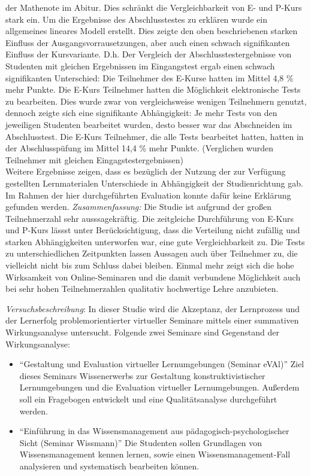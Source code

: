 \documentclass[12pt, bibliography=totoc]{scrartcl}
\begin{document}
der Mathenote im Abitur. Dies schränkt die Vergleichbarkeit von E- und
P-Kurs stark ein. Um die Ergebnisse des Abschlusstestes zu erklären
wurde ein allgemeines lineares Modell erstellt. Dies zeigte den oben
beschriebenen starken Einfluss der Ausgangsvorrausetzungen, aber auch
einen schwach signifikanten Einfluss der Kursvariante. D.h. Der
Vergleich der Abschlusstestergebnisse von Studenten mit gleichen
Ergebnissen im Eingangstest ergab einen schwach signifikanten
Unterschied: Die Teilnehmer des E-Kurse hatten im Mittel 4,8 \% mehr
Punkte. Die E-Kurs Teilnehmer hatten die Möglichkeit elektronische Tests
zu bearbeiten. Dies wurde zwar von vergleichsweise wenigen Teilnehmern
genutzt, dennoch zeigte sich eine signifikante Abhängigkeit: Je mehr
Tests von den jeweiligen Studenten bearbeitet wurden, desto besser war
das Abschneiden im Abschlusstest. Die E-Kurs Teilnehmer, die alle Tests
bearbeitet hatten, hatten in der Abschlusspüfung im Mittel 14,4 \% mehr
Punkte. (Verglichen wurden Teilnehmer mit gleichen
Eingagstestergebnissen)\\Weitere Ergebnisse zeigen, dass es bezüglich
der Nutzung der zur Verfügung gestellten Lernmaterialen Unterschiede in
Abhängigkeit der Studienrichtung gab. Im Rahmen der hier durchgeführten
Evaluation konnte dafür keine Erklärung gefunden werden.
\emph{Zusammenfassung:} Die Studie ist aufgrund der großen
Teilnehmerzahl sehr ausssagekräftig. Die zeitgleiche Durchführung von
E-Kurs und P-Kurs lässst unter Berücksichtigung, dass die Verteilung
nicht zufällig und starken Abhängigkeiten unterworfen war, eine gute
Vergleichbarkeit zu. Die Tests zu unterschiedlichen Zeitpunkten lassen
Aussagen auch über Teilnehmer zu, die vielleicht nicht bis zum Schluss
dabei bleiben. Einmal mehr zeigt sich die hohe Wirksamkeit von
Online-Seminaren und die damit verbundene Möglichkeit auch bei sehr
hohen Teilnehmerzahlen qualitativ hochwertige Lehre anzubieten.

\textbf{}

\emph{Versuchsbeschreibung}: In dieser Studie wird die Akzeptanz, der
Lernprozess und der Lernerfolg problemorientierter virtueller Seminare
mittels einer summativen Wirkungsanalyse untersucht. Folgende zwei
Seminare sind Gegenstand der Wirkungsanalyse:

\begin{itemize}
\item
  ``Gestaltung und Evaluation virtueller Lernumgebungen (Seminar eVAl)''
  Ziel dieses Seminars Wissenerwerbs zur Gestaltung konstruktivistischer
  Lernumgebungen und die Evaluation virtueller Lernumgebungen. Außerdem
  soll ein Fragebogen entwickelt und eine Qualitätsanalyse durchgeführt
  werden.
\item
  ``Einführung in das Wissensmanagement aus pädagogisch-psychologischer
  Sicht (Seminar Wissmann)'' Die Studenten sollen Grundlagen von
  Wissensmanagement kennen lernen, sowie einen Wissensmanagement-Fall
  analysieren und systematisch bearbeiten können.
\end{itemize}
\end{document}
